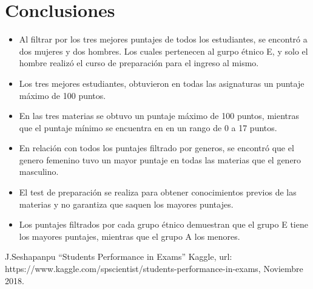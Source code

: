 \documentclass[conference,compsoc,onecolumn]{IEEEtran}
\begin{document}
        \section{Conclusiones}\label{conclusiones}
        \begin{itemize}
        \item Al filtrar por los tres mejores puntajes de todos los estudiantes, se encontró a dos mujeres y dos hombres. Los cuales pertenecen al gurpo étnico E, y solo el hombre realizó el curso de preparación para el ingreso al mismo.
        \item Los tres mejores estudiantes, obtuvieron en todas las asignaturas un puntaje máximo de 100 puntos.
        \item En las tres materias se obtuvo un puntaje máximo de 100 puntos, mientras que el puntaje mínimo se encuentra en en un rango de 0 a 17 puntos.
        \item En relación con todos los puntajes filtrado por generos, se encontró que el genero femenino tuvo un mayor puntaje en todas las materias que el genero masculino.
        \item El test de preparación se realiza para obtener conocimientos previos de las materias y no garantiza que saquen los mayores puntajes.
        \item Los puntajes filtrados por cada grupo étnico demuestran que el grupo E tiene los mayores puntajes, mientras que el grupo A los menores.
        \end{itemize} 
        
    \begin{thebibliography}{00}
     J.Seshapanpu ``Students Performance in Exams'' Kaggle, url: https://www.kaggle.com/spscientist/students-performance-in-exams, Noviembre 2018.
    \end{thebibliography}
\end{document}
